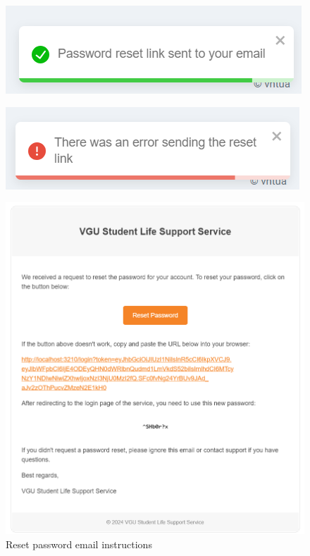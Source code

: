 \begin{figure}[H]
	\centering
	\begin{minipage}{.5\textwidth}
		\centering
		\includegraphics[width=.9\linewidth]{graphics/gui/user/reset-pass-success.png}
		\label{fig:gui-reset-pass-success}
	\end{minipage}%
	\begin{minipage}{.5\textwidth}
		\centering
		\includegraphics[width=0.9\linewidth]{graphics/gui/user/reset-pass-failed.png}
		\label{fig:gui-reset-pass-failed}
	\end{minipage}
\end{figure}


\begin{figure}[H]
	\centering
	\includegraphics[width=0.8\linewidth]{graphics/gui/user/email-reset.png}
	\caption{Reset password email instructions}
	\label{fig:gui-email-reset-pass}
\end{figure}




